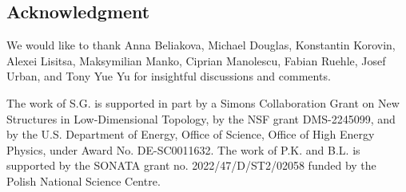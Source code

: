 
\subsection*{Acknowledgment}

We would like to thank Anna Beliakova, Michael Douglas, Konstantin Korovin, Alexei Lisitsa, Maksymilian Manko, Ciprian Manolescu, Fabian Ruehle, Josef Urban, and Tony Yue Yu for insightful discussions and comments.

The work of S.G. is supported in part by a Simons Collaboration Grant on New Structures in Low-Dimensional Topology, by the NSF grant DMS-2245099, and by the U.S. Department of Energy, Office of Science, Office of High Energy Physics, under Award No. DE-SC0011632. The work of P.K. and B.L. is supported by the SONATA grant no. 2022/47/D/ST2/02058 funded by the Polish National Science Centre.